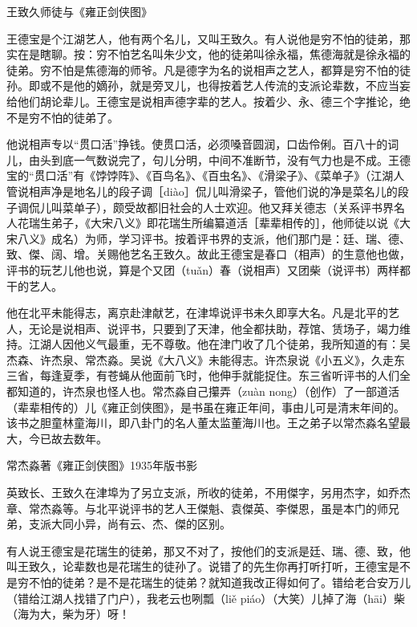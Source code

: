 \documentclass[12pt,UTF8]{ctexbook}
\begin{document}
王致久师徒与《雍正剑侠图》


王德宝是个江湖艺人，他有两个名儿，又叫王致久。有人说他是穷不怕的徒弟，那实在是瞎聊。按：穷不怕艺名叫朱少文，他的徒弟叫徐永福，焦德海就是徐永福的徒弟。穷不怕是焦德海的师爷。凡是德字为名的说相声之艺人，都算是穷不怕的徒孙。即或不是他的嫡孙，就是旁叉儿，也得按着艺人传流的支派论辈数，不应当妄给他们胡论辈儿。王德宝是说相声德字辈的艺人。按着少、永、德三个字推论，绝不是穷不怕的徒弟了。

他说相声专以“贯口活”挣钱。使贯口活，必须嗓音圆润，口齿伶俐。百八十的词儿，由头到底一气数说完了，句儿分明，中间不准断节，没有气力也是不成。王德宝的“贯口活”有《饽饽阵》、《百鸟名》、《百虫名》、《滑梁子》、《菜单子》（江湖人管说相声净是地名儿的段子调［diào］侃儿叫滑梁子，管他们说的净是菜名儿的段子调侃儿叫菜单子），颇受故都旧社会的人士欢迎。他又拜关德志（关系评书界名人花瑞生弟子，《大宋八义》即花瑞生所编纂道活［辈辈相传的］，他师徒以说《大宋八义》成名）为师，学习评书。按着评书界的支派，他们那门是：廷、瑞、德、致、傑、阔、增。关赐他艺名王致久。故此王德宝是春口（相声）的生意他也做，评书的玩艺儿他也说，算是个又团（tuǎn）春（说相声）又团柴（说评书）两样都干的艺人。

他在北平未能得志，离京赴津献艺，在津埠说评书未久即享大名。凡是北平的艺人，无论是说相声、说评书，只要到了天津，他全都扶助，荐馆、赁场子，竭力维持。江湖人因他义气最重，无不尊敬。他在津门收了几个徒弟，我所知道的有：吴杰森、许杰泉、常杰淼。吴说《大八义》未能得志。许杰泉说《小五义》，久走东三省，每逢夏季，有苍蝇从他面前飞时，他伸手就能捉住。东三省听评书的人们全都知道的，许杰泉也怪人也。常杰淼自己攥弄（zuàn nong）（创作）了一部道活（辈辈相传的）儿《雍正剑侠图》，是书虽在雍正年间，事由儿可是清末年间的。该书之胆童林童海川，即八卦门的名人董太监董海川也。王之弟子以常杰淼名望最大，今已故去数年。

常杰淼著《雍正剑侠图》1935年版书影



英致长、王致久在津埠为了另立支派，所收的徒弟，不用傑字，另用杰字，如乔杰章、常杰淼等。与北平说评书的艺人王傑魁、袁傑英、李傑恩，虽是本门的师兄弟，支派大同小异，尚有云、杰、傑的区别。

有人说王德宝是花瑞生的徒弟，那又不对了，按他们的支派是廷、瑞、德、致，他叫王致久，论辈数也是花瑞生的徒孙了。说错了的先生你再打听打听，王德宝是不是穷不怕的徒弟？是不是花瑞生的徒弟？就知道我改正得如何了。错给老合安万儿（错给江湖人找错了门户），我老云也咧瓢（liě piáo）（大笑）儿掉了海（hāi）柴（海为大，柴为牙）呀！
\end{document}
